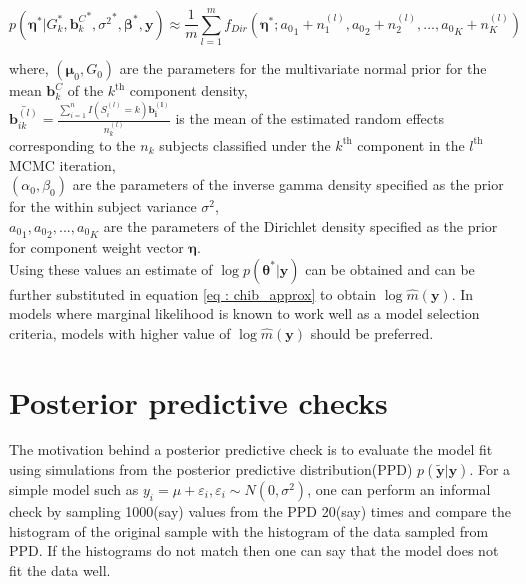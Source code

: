 \begin{equation}
p({\boldsymbol{\eta}}^*|G_k^*, {\boldsymbol{b}_k^C}^*, {\sigma^2}^*,{\boldsymbol{\beta}}^*, \boldsymbol{y}) \approx 
\frac 1 m \sum_{l=1}^m f_{Dir}({\boldsymbol{\eta}}^*; {a_0}_1 + n_1^{(l)}, {a_0}_2 + n_2^{(l)}, ..., {a_0}_K + n_K^{(l)})
\end{equation}

where, 
$(\boldsymbol{\mu}_0, G_0)$ are the parameters for the multivariate normal prior for the mean $\boldsymbol{b}_k^C$ of the $k^\text{th}$ component density,\\
$\bar{\boldsymbol{b}_{ik}^{(l)}} = \frac {\sum_{i=1}^n I(S_i^{(l)}=k) \boldsymbol{b_i^{(l)}}} {n_k^{(l)}}$ is the mean of the estimated random effects corresponding to the $n_k$ subjects classified under the $k^\text{th}$ component in the $l^\text{th}$ MCMC iteration,\\
$(\alpha_0, \beta_0)$ are the parameters of the inverse gamma density specified as the prior for the within subject variance $\sigma^2$,\\
${a_0}_1, {a_0}_2,..., {a_0}_K$ are the parameters of the Dirichlet density specified as the prior for component weight vector $\boldsymbol{\eta}$.\\

Using these values an estimate of $\log{p(\boldsymbol{\theta}^*|\boldsymbol{y})}$ can be obtained and can be further substituted in equation \ref{eq : chib_approx} to obtain $\log{\hat{m}(\boldsymbol{y})}$. In models where marginal likelihood is known to work well as a model selection criteria, models with higher value of $\log{\hat{m}(\boldsymbol{y})}$ should be preferred.

\section{Posterior predictive checks}
\label{sec : ppc}
The motivation behind a posterior predictive check is to evaluate the model fit using simulations from the posterior predictive distribution(PPD) $p(\boldsymbol{\tilde{y}}|\boldsymbol{y})$. For a simple model such as $y_i = \mu + \varepsilon_i, \varepsilon_i \sim N(0, \sigma^2)$, one can perform an informal check by sampling 1000(say) values from the PPD 20(say) times and compare the histogram of the original sample with the histogram of the data sampled from PPD. If the histograms do not match then one can say that the model does not fit the data well.\\

